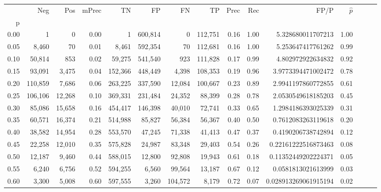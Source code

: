 \begin{tabular}{rrrrrrrrrrrrrrr}
\toprule
{} &      Neg &     Pos & mPrec &       TN &       FP &       FN &       TP &  Prec &   Rec &                    FP/P & $\hat{p}$ \\
p    &          &         &       &          &          &          &          &       &       &                         &           \\
\midrule
0.00 &        1 &       0 &  0.00 &        1 &  600,814 &        0 &  112,751 &  0.16 &  1.00 &       5.328680011707213 &      1.00 \\
0.05 &    8,460 &      70 &  0.01 &    8,461 &  592,354 &       70 &  112,681 &  0.16 &  1.00 &       5.253647417761262 &      0.99 \\
0.10 &   50,814 &     853 &  0.02 &   59,275 &  541,540 &      923 &  111,828 &  0.17 &  0.99 &       4.802972922634832 &      0.92 \\
0.15 &   93,091 &   3,475 &  0.04 &  152,366 &  448,449 &    4,398 &  108,353 &  0.19 &  0.96 &      3.9773394471002472 &      0.78 \\
0.20 &  110,859 &   7,686 &  0.06 &  263,225 &  337,590 &   12,084 &  100,667 &  0.23 &  0.89 &      2.9941197860772855 &      0.61 \\
0.25 &  106,106 &  12,268 &  0.10 &  369,331 &  231,484 &   24,352 &   88,399 &  0.28 &  0.78 &      2.0530549618185203 &      0.45 \\
0.30 &   85,086 &  15,658 &  0.16 &  454,417 &  146,398 &   40,010 &   72,741 &  0.33 &  0.65 &      1.2984186393025339 &      0.31 \\
0.35 &   60,571 &  16,374 &  0.21 &  514,988 &   85,827 &   56,384 &   56,367 &  0.40 &  0.50 &      0.7612083263119618 &      0.20 \\
0.40 &   38,582 &  14,954 &  0.28 &  553,570 &   47,245 &   71,338 &   41,413 &  0.47 &  0.37 &      0.4190206738742894 &      0.12 \\
0.45 &   22,258 &  12,010 &  0.35 &  575,828 &   24,987 &   83,348 &   29,403 &  0.54 &  0.26 &     0.22161222516873463 &      0.08 \\
0.50 &   12,187 &   9,460 &  0.44 &  588,015 &   12,800 &   92,808 &   19,943 &  0.61 &  0.18 &     0.11352449202224371 &      0.05 \\
0.55 &    6,240 &   6,756 &  0.52 &  594,255 &    6,560 &   99,564 &   13,187 &  0.67 &  0.12 &      0.0581813021613999 &      0.03 \\
0.60 &    3,300 &   5,008 &  0.60 &  597,555 &    3,260 &  104,572 &    8,179 &  0.72 &  0.07 &    0.028913269061915194 &      0.02 \\

\end{tabular}
